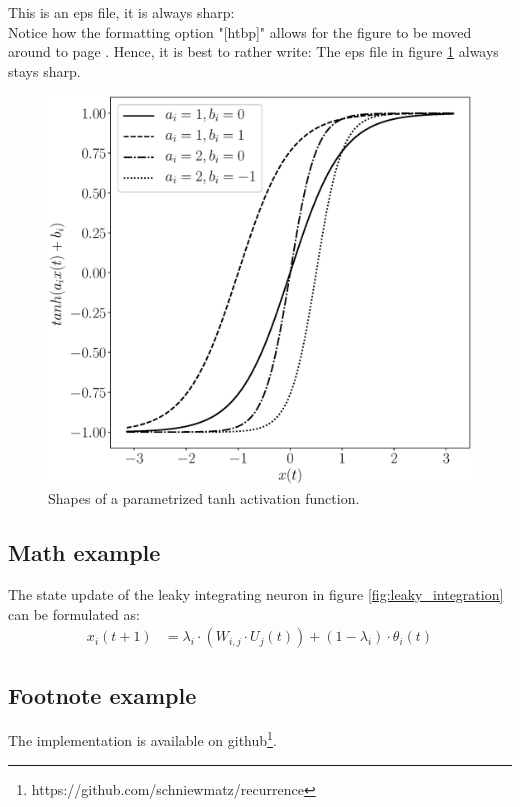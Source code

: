 This is an eps file, it is always sharp:\\
Notice how the formatting option "[htbp]" allows for the figure to be moved around to page \pageref{fig:activation_function}. Hence, it is best to rather write: The eps file in figure \ref{fig:activation_function} always stays sharp.
\begin{figure}[htbp]
    \centering
    \includegraphics[width=.7\textwidth]{figures/activation_functions}
    \caption{Shapes of a parametrized tanh activation function.}
    \label{fig:activation_function}
\end{figure}

\subsection{Math example}
The state update of the leaky integrating neuron in figure \ref{fig:leaky_integration} can be formulated as:
\begin{align}
    x_i(t+1) &= \lambda_i \cdot \left(W_{i,j} \cdot U_j(t)\right) + (1-\lambda_i) \cdot \theta_i(t)
    \label{eq:leaky_integration}
\end{align}

\subsection{Footnote example}
The implementation is available on github\footnote{https://github.com/schniewmatz/recurrence}.